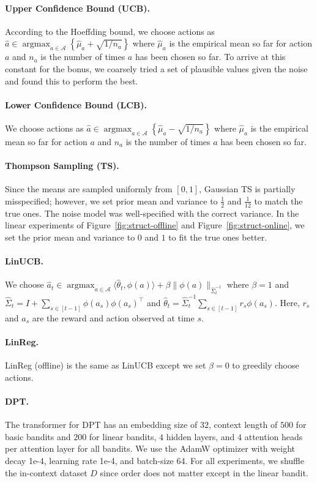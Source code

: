 \documentclass{article}
\newcommand{\Acal}{\mathcal{A}}
\newcommand*{\argmax}{\mathop{\mathrm{argmax}}}
\newcommand{\dotp}[2]{\langle{#1},{#2}\rangle}
\newcommand{\macroName}{DPT}
\begin{document}
\paragraph{Upper Confidence Bound (UCB).}
According to the Hoeffding bound, we choose actions as
$\hat a \in \argmax_{a \in \Acal} \left\{  \hat \mu_a + \sqrt{1 / n_a} \right\}$
where $\hat \mu_a$ is the empirical mean so far for action $a$ and $n_a$ is the number of times $a$ has been chosen so far. To arrive at this constant for the bonus, we coarsely tried a set of plausible values given the noise and found this to perform the best.
\paragraph{Lower Confidence Bound (LCB).}
We choose actions as    $\hat a \in \argmax_{a \in \Acal} \left\{  \hat \mu_a - \sqrt{1 / n_a} \right\}$
where $\hat \mu_a$ is the empirical mean so far for action $a$ and $n_a$ is the number of times $a$ has been chosen so far.
\paragraph{Thompson Sampling (TS).} Since the means are sampled uniformly from $[0, 1]$, Gaussian TS is partially misspecified; however, we set prior mean and variance to $\frac{1}{2}$ and $\frac{1}{12}$ to match the true ones. The noise model was well-specified with the correct variance. In the linear experiments of Figure~\ref{fig:struct-offline} and Figure~\ref{fig:struct-online}, we set the prior mean and variance to $0$ and $1$ to fit the true ones better.
\paragraph{LinUCB.} We choose $\hat a_t \in \argmax_{a \in \Acal} \dotp{ \hat \theta_t}{\phi(a)} + \beta \| \phi(a) \|_{\hat \Sigma^{-1}_t}$ where $\beta = 1$ and $\hat \Sigma_t = I + \sum_{s \in [t- 1] }  \phi(a_s)\phi(a_s)^\top$ and $\hat \theta_t = \hat \Sigma^{-1}_t \sum_{s \in [t - 1]} r_s \phi(a_s)$. Here, $r_s$ and $a_s$ are the reward and action observed at time $s$.
\paragraph{LinReg.} LinReg (offline) is the same as LinUCB except we set $\beta = 0$ to greedily choose actions.
\paragraph{\macroName{}.} The transformer for \macroName{} has an embedding size of $32$, context length of $500$ for basic bandits and $200$ for linear bandits, $4$ hidden layers, and $4$ attention heads per attention layer for all bandits. We use the AdamW optimizer with weight decay 1e-4, learning rate 1e-4, and batch-size 64. For all experiments, we shuffle the in-context dataset $D$ since order does not matter except in the linear bandit.
\end{document}
